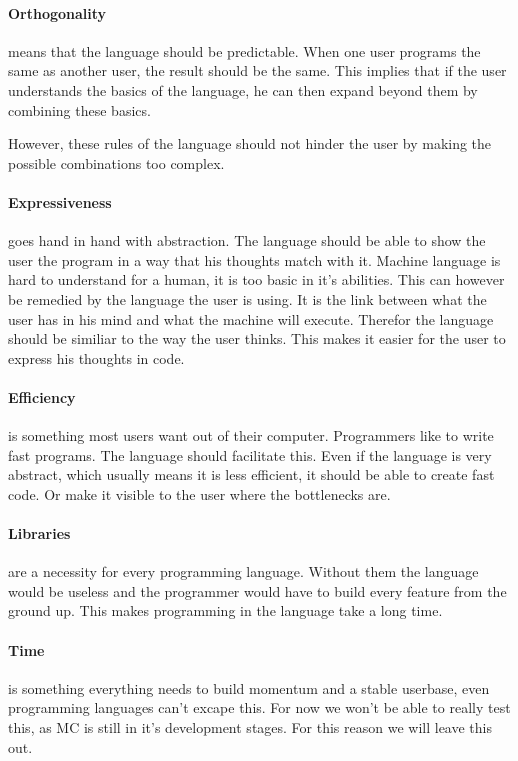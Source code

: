 \begin{multicols}{2}
\paragraph{Orthogonality}
means that the language should be predictable.
 When one user programs the same as another user, the result should be the same.
 This implies that if the user understands the basics of the language, he can then expand beyond them by combining these basics.

However, these rules of the language should not hinder the user by making the possible combinations too complex.

\paragraph{Expressiveness}
goes hand in hand with abstraction.
 The language should be able to show the user the program in a way that his thoughts match with it.
 Machine language is hard to understand for a human, it is too basic in it's abilities.
 This can however be remedied by the language the user is using.
 It is the link between what the user has in his mind and what the machine will execute.
 Therefor the language should be similiar to the way the user thinks.
 This makes it easier for the user to express his thoughts in code.

\paragraph{Efficiency}
is something most users want out of their computer.
 Programmers like to write fast programs.
 The language should facilitate this.
 Even if the language is very abstract, which usually means it is less efficient\cite{}, it should be able to create fast code.
 Or make it visible to the user where the bottlenecks are.

\paragraph{Libraries}
are a necessity for every programming language.
 Without them the language would be useless and the programmer would have to build every feature from the ground up.
 This makes programming in the language take a long time.

\paragraph{Time}
is something everything needs to build momentum and a stable userbase, even programming languages can't excape this.
 For now we won't be able to really test this, as MC is still in it's development stages.
 For this reason we will leave this out.


\end{multicols}
